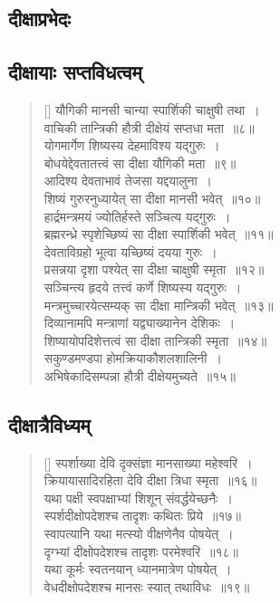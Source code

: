 \documentclass[twoside,12pt,notitlepage]{book}
\begin{document}
 \subsection{दीक्षाप्रभेदः}
\subsection*{दीक्षायाः सप्तविधत्वम्}
\begin{verse}[\versewidth]
यौगिकी मानसी चान्या स्पार्शिकी चाक्षुषी तथा~।\\[-6pt]
वाचिकी तान्त्रिकी हौत्री दीक्षेयं  सप्तधा मता~॥८॥\\
योगमार्गेण शिष्यस्य देहमाविश्य यद्गुरुः~।\\[-6pt]
बोधयेद्देवतातत्त्वं सा दीक्षा यौगिकी मता~॥९॥\\
आदिश्य देवताभावं तेजसा यद्दयालुना~।\\[-6pt]
शिष्यं गुरुरनुध्यायेत् सा दीक्षा मानसी भवेत्~॥१०॥\\
हार्द्रमन्त्रमयं ज्योतिर्हस्ते सञ्चित्य यद्गुरुः~।\\[-6pt]
ब्रह्मरन्ध्रे स्पृशेच्छिष्यं सा दीक्षा स्पार्शिकी भवेत्~॥११॥\footB\ \\
देवताविग्रहो भूत्वा यच्छिष्यं दयया गुरुः~।\\[-6pt]
प्रसन्नया दृशा पश्येत् सा दीक्षा चाक्षुषी स्मृता~॥१२॥\footB\ \\
सञ्चिन्त्य हृदये तत्त्वं कर्णे शिष्यस्य यद्गुरुः~।\\[-6pt]
मन्त्रमुच्चारयेत्सम्यक् सा दीक्षा मान्त्रिकी भवेत्~॥१३॥\\
दिव्यानामपि मन्त्राणां यद्व्याख्यानेन देशिकः~।\\[-6pt]
शिष्यायोपदिशेत्तत्वं सा दीक्षा तान्त्रिकी स्मृता~॥१४॥\footB\ \\
सकुण्डमण्डपा होमक्रियाकौशलशालिनी~।\\[-6pt]
अभिषेकादिसम्पन्ना हौत्री दीक्षेयमुच्यते~॥१५॥
\end{verse}

\subsection*{दीक्षात्रैविध्यम् }
\begin{verse}[\versewidth]
स्पर्शाख्या देवि दृक्संज्ञा मानसाख्या महेश्वरि~।\\[-6pt]
क्रियायासादिरहिता देवि दीक्षा  त्रिधा स्मृता~॥१६॥\\ 
यथा पक्षी स्वपक्षाभ्यां शिशून् संवर्द्धयेच्छनैः~।\\[-6pt]
स्पर्शदीक्षोपदेशश्च तादृशः कथितः प्रिये~॥१७॥\\
स्वापत्यानि यथा मत्स्यो वीक्षणेनैव पोषयेत्~।\\[-6pt]
दृग्भ्यां दीक्षोपदेशश्च तादृशः परमेश्वरि~॥१८॥\\
यथा कूर्मः स्वतनयान् ध्यानमात्रेण पोषयेत्~।\\[-6pt]
वेधदीक्षोपदेशश्च मानसः स्यात् तथाविधः~॥१९॥\\
\end{verse}
\end{document}
